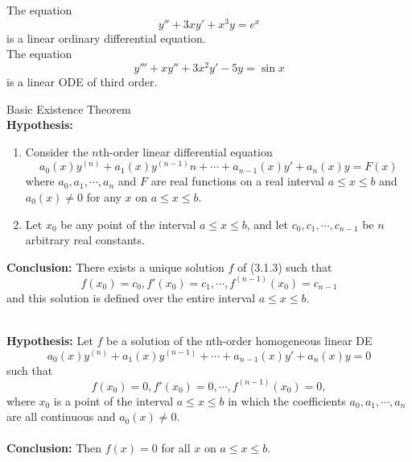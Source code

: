 \begin{example}{}{}
    The equation \[
        y'' + 3xy' + x^3y = e^x
    \] is a linear ordinary differential equation.\\
    The equation \[
        y''' + xy'' + 3x^2y' - 5y = \sin x
    \] is a linear ODE of third order.
\end{example}

\begin{theorem}{Basic Existence Theorem}{}
    \\\textbf{Hypothesis:}
    \begin{enumerate}
        \item Consider the $n$th-order linear differential equation
            \begin{equation}
                a_0(x)y^{(n)} + a_1(x)y^{(n-1)}n + \cdots + a_{n-1}(x)y' + a_n(x)y = F(x)
            \end{equation}
        where $a_0, a_1, \cdots, a_n$ and $F$ are real functions on a real interval $a \le x \le b$ and $a_0(x) \neq 0$ for any  $x$ on $a \le x \le b$.
        \item Let $x_0$ be any point of the interval $a \le x \le b$, and let $c_0, c_1, \cdots, c_{n-1}$ be $n$ arbitrary real constants.
    \end{enumerate}
    \textbf{Conclusion:} There exists a unique solution $f$ of (3.1.3) such that \[
        f(x_0) = c_0, f'(x_0) = c_1, \cdots, f^{(n-1)}(x_0) = c_{n-1}
    \]
    and this solution is defined over the entire interval $a \le x \le b$.
\end{theorem}

\begin{corollary}{}{}
    \\\textbf{Hypothesis:} Let $f$ be a solution of the nth-order homogeneous linear DE
    \begin{equation}
        a_0(x)y^{(n)} + a_1(x)y^{(n-1)} + \cdots + a_{n-1}(x)y' + a_n(x)y = 0
    \end{equation}
    such that \[
        f(x_0)=0, f'(x_0)=0, \cdots, f^{(n-1)}(x_0)=0,
    \] where $x_0$ is a point of the interval $a \le x \le b$ in which the coefficients $a_0, a_1, \cdots, a_n$ are all continuous and $a_0(x) \neq 0$. \\~\\
    \textbf{Conclusion:} Then $f(x)=0$ for all $x$ on $a \le x \le b$.
\end{corollary}































